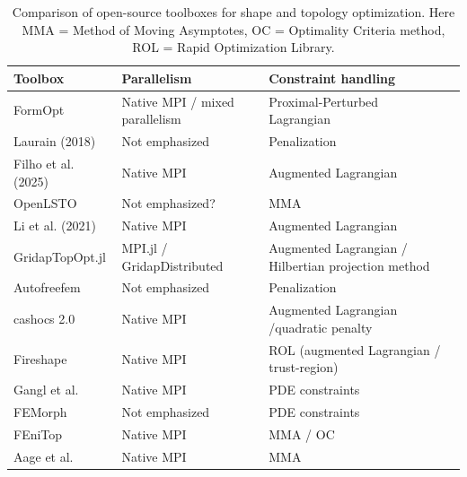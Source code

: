 \documentclass[preprint,9pt]{elsarticle}
\begin{document}
	\begin{table}[h]
		\centering
		\footnotesize
		\begin{tabularx}{\textwidth}{l l l l}
		\toprule
		\textbf{Toolbox}  & \textbf{Parallelism}  & \textbf{Constraint handling}  \\
		\midrule
		
		FormOpt 
		& Native MPI / mixed parallelism
		& Proximal-Perturbed Lagrangian\\
		
		Laurain (2018) \cite{MR3843884} 
		& Not emphasized 
		& Penalization \\

		Filho et al. (2025) \cite{MR4916810} 
		& Native MPI 
		& Augmented Lagrangian \\

		OpenLSTO \cite{Kambampati2018}
		&  Not emphasized?
		& MMA\\

		Li et al. (2021) \cite{LI2021103561} 
		& Native MPI 
		& Augmented Lagrangian\\

		GridapTopOpt.jl \cite{Wegert2025} 
		& MPI.jl / GridapDistributed
		& Augmented Lagrangian / Hilbertian projection method \\

		Autofreefem \cite{Allaire2024} 
		& Not emphasized
		& Penalization\\
		
		cashocs 2.0 \cite{BLAUTH2021100646,BLAUTH2023101577} 
		& Native MPI 
		& Augmented Lagrangian /quadratic penalty  \\
		
		Fireshape \cite{MR4244971} 
		& Native MPI 
		& ROL (augmented Lagrangian / trust-region)\\

		Gangl et al. \cite{MR4233697} 
		& Native MPI
		& PDE constraints\\

		FEMorph \cite{Schmidt1} 
		& Not emphasized
		& PDE constraints\\

		FEniTop \cite{Jia2024} 
		& Native MPI 
		& MMA / OC\\
				
		Aage et al. \cite{MR3334238} 
		& Native MPI	
		& MMA \\
	
		
		\bottomrule
		\end{tabularx}
		\caption{Comparison of open-source toolboxes for shape and topology optimization. Here MMA = Method of Moving Asymptotes, OC = Optimality Criteria method, ROL = Rapid Optimization Library.}
		\label{tab2}
		\end{table}
\end{document}
